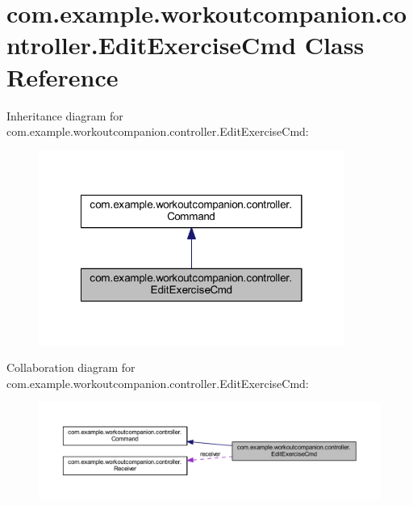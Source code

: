 \hypertarget{classcom_1_1example_1_1workoutcompanion_1_1controller_1_1_edit_exercise_cmd}{\section{com.\-example.\-workoutcompanion.\-controller.\-Edit\-Exercise\-Cmd Class Reference}
\label{classcom_1_1example_1_1workoutcompanion_1_1controller_1_1_edit_exercise_cmd}
}


Inheritance diagram for com.\-example.\-workoutcompanion.\-controller.\-Edit\-Exercise\-Cmd\-:
\nopagebreak
\begin{figure}[H]
\begin{center}
\leavevmode
\includegraphics[width=284pt]{classcom_1_1example_1_1workoutcompanion_1_1controller_1_1_edit_exercise_cmd__inherit__graph}
\end{center}
\end{figure}


Collaboration diagram for com.\-example.\-workoutcompanion.\-controller.\-Edit\-Exercise\-Cmd\-:
\nopagebreak
\begin{figure}[H]
\begin{center}
\leavevmode
\includegraphics[width=350pt]{classcom_1_1example_1_1workoutcompanion_1_1controller_1_1_edit_exercise_cmd__coll__graph}
\end{center}
\end{figure}
